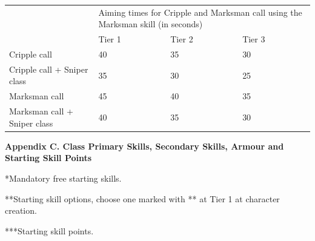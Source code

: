 \begin{table}
\begin{tabular}{|l|l|l|l|} \hline 
\multirow{1}{*}{}& \multicolumn{3}{|l|}{Aiming times for Cripple and Marksman call using the Marksman skill (in seconds)} \\
\cline{2-2}\cline{3-3}\cline{4-4} & Tier 1 & Tier 2 & Tier 3 \\
 \hline Cripple call & 40 & 35 & 30 \\
 \hline Cripple call + Sniper class & 35 & 30 & 25 \\
 \hline Marksman call & 45 & 40 & 35 \\
 \hline Marksman call + Sniper class & 40 & 35 & 30 \\
 \hline \end{tabular}

\end{table}

\textbf{Appendix C. Class Primary Skills, Secondary Skills, Armour and Starting Skill Points}

*Mandatory free starting skills.

**Starting skill options, choose one marked with ** at Tier 1 at character creation.

***Starting skill points.

